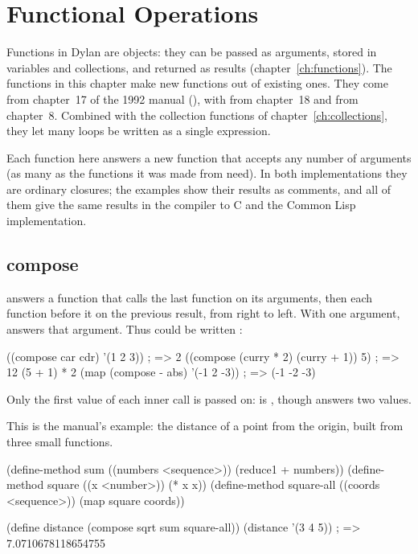 \chapter{Functional Operations}\label{ch:functional}

Functions in Dylan are objects: they can be passed as arguments, stored
in variables and collections, and returned as results
(chapter~\ref{ch:functions}). The functions in this chapter make new
functions out of existing ones. They come from chapter~17 of the 1992
manual (), with  from chapter~18
and  from chapter~8. Combined with the collection functions
of chapter~\ref{ch:collections}, they let many loops be written as a
single expression.

Each function here answers a new function that accepts any number of
arguments (as many as the functions it was made from need). In both
implementations they are ordinary closures; the examples show their
results as comments, and all of them give the same results in the
compiler to C and the Common Lisp implementation.

\section{compose}\label{sec:functional-compose}

 answers a function that calls the
last function on its arguments, then each function before it on the
previous result, from right to left. With one argument, 
answers that argument. Thus  could be written
:

\begin{dylan}
((compose car cdr) '(1 2 3))              ; => 2
((compose (curry * 2) (curry + 1)) 5)     ; => 12     (5 + 1) * 2
(map (compose - abs) '(-1 2 -3))          ; => (-1 -2 -3)
\end{dylan}

\noindent Only the first value of each inner call is passed on:
 is , though 
answers two values.

This is the manual's example: the distance of a point from the origin,
built from three small functions.

\begin{dylan}
(define-method sum ((numbers <sequence>))
  (reduce1 + numbers))
(define-method square ((x <number>)) (* x x))
(define-method square-all ((coords <sequence>))
  (map square coords))

(define distance (compose sqrt sum square-all))
(distance '(3 4 5))      ; => 7.0710678118654755
\end{dylan}

